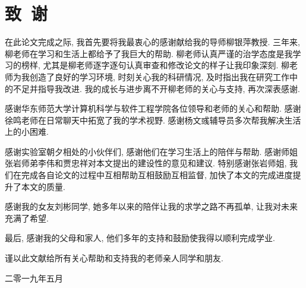 \chapter*{致\ 谢}
{\kaishu

在此论文完成之际, 我首先要将我最衷心的感谢献给我的导师柳银萍教授. 三年来, 柳老师在学习和生活上都给予了我巨大的帮助. 柳老师认真严谨的治学态度是我学习的榜样, 尤其是柳老师逐字逐句认真审查和修改论文的样子让我印象深刻. 柳老师为我创造了良好的学习环境, 时刻关心我的科研情况, 及时指出我在研究工作中的不足并指导我改进. 我的成长与进步离不开柳老师的关心与支持, 再次深表感谢. 

感谢华东师范大学计算机科学与软件工程学院各位领导和老师的关心和帮助. 感谢徐鸣老师在日常聊天中拓宽了我的学术视野. 感谢杨文彧辅导员多次帮我解决生活上的小困难. 

感谢实验室朝夕相处的小伙伴们, 感谢他们在学习生活上的陪伴与帮助. 感谢师姐张岩\D 师弟李伟和贾忠祥对本文提出的建设性的意见和建议. 特别感谢张岩师姐, 我们在完成各自论文的过程中互相帮助\D 互相鼓励\D 互相监督, 加快了本文的完成进度\D 提升了本文的质量. 

感谢我的女友刘彬同学, 她多年以来的陪伴让我的求学之路不再孤单, 让我对未来充满了希望. 

最后, 感谢我的父母和家人, 他们多年的支持和鼓励使我得以顺利完成学业.

谨以此文献给所有关心\D 帮助和支持我的老师\D 亲人\D 同学和朋友.

\hfill{}

\hfill 二零一九年五月

}
